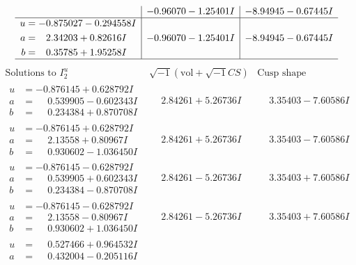 \documentclass[1p]{elsarticle_modified}
\theoremstyle{definition}
\newcommand{\I}{\sqrt{-1}}
\begin{document}
$$\begin{array}{c|c|c}
 & -0.96070 - 1.25401 I & -8.94945 - 0.67445 I \\ \hline\begin{aligned}
u &= -0.875027 - 0.294558 I \\
a &= \phantom{-}2.34203 + 0.82616 I \\
b &= \phantom{-}0.35785 + 1.95258 I\end{aligned}
 & -0.96070 - 1.25401 I & -8.94945 - 0.67445 I\\
 \hline 
 \end{array}$$\newpage$$\begin{array}{c|c|c}  
\text{Solutions to }I^u_{2}& \I (\text{vol} + \sqrt{-1}CS) & \text{Cusp shape}\\
 \hline 
\begin{aligned}
u &= -0.876145 + 0.628792 I \\
a &= \phantom{-}0.539905 - 0.602343 I \\
b &= \phantom{-}0.234384 + 0.870708 I\end{aligned}
 & \phantom{-}2.84261 + 5.26736 I & \phantom{-}3.35403 - 7.60586 I \\ \hline\begin{aligned}
u &= -0.876145 + 0.628792 I \\
a &= \phantom{-}2.13558 + 0.80967 I \\
b &= \phantom{-}0.930602 - 1.036450 I\end{aligned}
 & \phantom{-}2.84261 + 5.26736 I & \phantom{-}3.35403 - 7.60586 I \\ \hline\begin{aligned}
u &= -0.876145 - 0.628792 I \\
a &= \phantom{-}0.539905 + 0.602343 I \\
b &= \phantom{-}0.234384 - 0.870708 I\end{aligned}
 & \phantom{-}2.84261 - 5.26736 I & \phantom{-}3.35403 + 7.60586 I \\ \hline\begin{aligned}
u &= -0.876145 - 0.628792 I \\
a &= \phantom{-}2.13558 - 0.80967 I \\
b &= \phantom{-}0.930602 + 1.036450 I\end{aligned}
 & \phantom{-}2.84261 - 5.26736 I & \phantom{-}3.35403 + 7.60586 I \\ \hline\begin{aligned}
u &= \phantom{-}0.527466 + 0.964532 I \\
a &= \phantom{-}0.432004 - 0.205116 I \\

\end{aligned}
\end{array}$$
\end{document}
